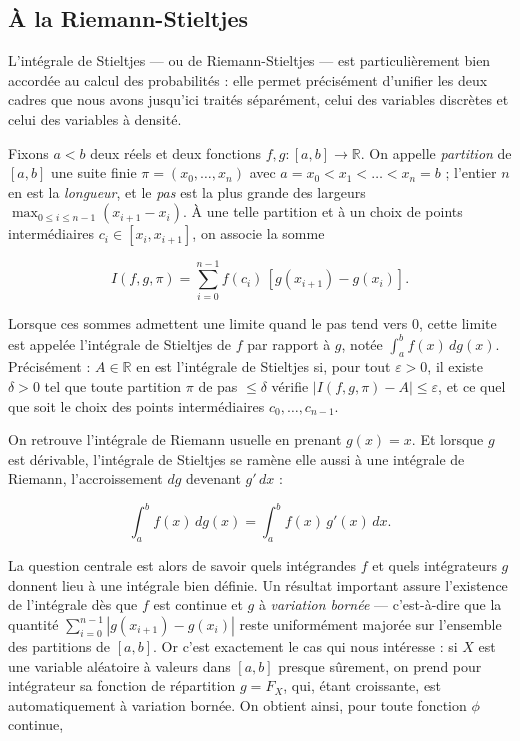 \subsection{À la Riemann-Stieltjes}

L'intégrale de Stieltjes — ou de Riemann-Stieltjes — est particulièrement bien accordée au calcul des probabilités : elle permet précisément d'unifier les deux cadres que nous avons jusqu'ici traités séparément, celui des variables discrètes et celui des variables à densité.

Fixons $a < b$ deux réels et deux fonctions $f, g : [a, b] \to \mathbb{R}$. On appelle \emph{partition} de $[a, b]$ une suite finie $\pi = (x_0, \dots, x_n)$ avec $a = x_0 < x_1 < \dots < x_n = b$ ; l'entier $n$ en est la \emph{longueur}, et le \emph{pas} est la plus grande des largeurs $\max_{0 \leq i \leq n-1} (x_{i+1} - x_i)$. À une telle partition et à un choix de points intermédiaires $c_i \in [x_i, x_{i+1}]$, on associe la somme

$$
I(f, g, \pi) = \sum_{i=0}^{n-1} f(c_i)\, [g(x_{i+1}) - g(x_i)].
$$

Lorsque ces sommes admettent une limite quand le pas tend vers $0$, cette limite est appelée l'intégrale de Stieltjes de $f$ par rapport à $g$, notée $\int_a^b f(x)\, dg(x)$. Précisément : $A \in \mathbb{R}$ en est l'intégrale de Stieltjes si, pour tout $\varepsilon > 0$, il existe $\delta > 0$ tel que toute partition $\pi$ de pas $\leq \delta$ vérifie $|I(f, g, \pi) - A| \leq \varepsilon$, et ce quel que soit le choix des points intermédiaires $c_0, \dots, c_{n-1}$.

On retrouve l'intégrale de Riemann usuelle en prenant $g(x) = x$. Et lorsque $g$ est dérivable, l'intégrale de Stieltjes se ramène elle aussi à une intégrale de Riemann, l'accroissement $dg$ devenant $g'\, dx$ :

$$
\int_a^b f(x)\, dg(x) = \int_a^b f(x)\, g'(x)\, dx.
$$

La question centrale est alors de savoir quels intégrandes $f$ et quels intégrateurs $g$ donnent lieu à une intégrale bien définie. Un résultat important assure l'existence de l'intégrale dès que $f$ est continue et $g$ à \emph{variation bornée} — c'est-à-dire que la quantité $\sum_{i=0}^{n-1} |g(x_{i+1}) - g(x_i)|$ reste uniformément majorée sur l'ensemble des partitions de $[a, b]$. Or c'est exactement le cas qui nous intéresse : si $X$ est une variable aléatoire à valeurs dans $[a, b]$ presque sûrement, on prend pour intégrateur sa fonction de répartition $g = F_X$, qui, étant croissante, est automatiquement à variation bornée. On obtient ainsi, pour toute fonction $\phi$ continue,

